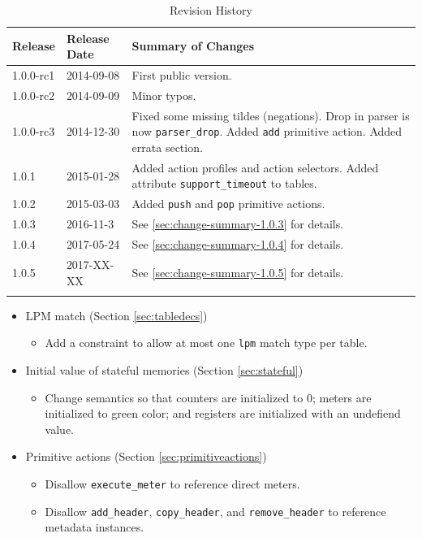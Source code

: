\documentclass[12pt]{article}
\begin{document}
\begin{table}[H]
\begin{center}
\begin{tabular}{| l | l | p{} |} \hline
\textbf{Release} &
\textbf{Release Date} &
\textbf{Summary of Changes} \\  \hline
1.0.0-rc1 & 2014-09-08 & First public version. \\  \hline
1.0.0-rc2 & 2014-09-09 & Minor typos. \\  \hline
1.0.0-rc3 & 2014-12-30 & Fixed some missing tildes (negations). Drop in parser is now \texttt{parser_drop}. Added \texttt{add} primitive action. Added errata section. \\  \hline
1.0.1 & 2015-01-28 & Added action profiles and action selectors. Added attribute \texttt{support_timeout} to tables. \\  \hline
1.0.2 & 2015-03-03 & Added \texttt{push} and \texttt{pop} primitive actions. \\  \hline
1.0.3 & 2016-11-3 & See \ref{sec:change-summary-1.0.3} for details. \\ \hline
1.0.4 & 2017-05-24 & See \ref{sec:change-summary-1.0.4} for details. \\ \hline
1.0.5 & 2017-XX-XX & See \ref{sec:change-summary-1.0.5} for details. \\ \hline
}
\end{tabular}
\end{center}
\caption{Revision History}
\label{tab:revhistory}
\end{table}


\begin{itemize}
\item LPM match (Section \ref{sec:tabledecs})
\begin{itemize}
\item Add a constraint to allow at most one \texttt{lpm} match type per table.
\end{itemize}
\item Initial value of stateful memories (Section \ref{sec:stateful})
\begin{itemize}
\item Change semantics so that counters are initialized to 0; meters are initialized to green color; and registers are initialized with an undefiend value.
\end{itemize}
\item Primitive actions (Section \ref{sec:primitiveactions})
\begin{itemize}
\item Disallow \texttt{execute_meter} to reference direct meters.
\item Disallow \texttt{add_header}, \texttt{copy_header}, and \texttt{remove_header} to reference metadata instances.
\end{itemize}
\end{itemize}
\end{document}
